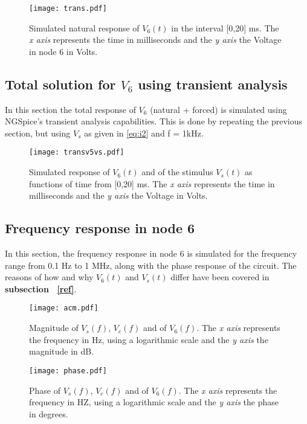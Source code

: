 \begin{figure}[H] \centering
\texttt{[image: trans.pdf]}
\caption{Simulated natural response of $V_6(t)$ in the interval [0,20] ms. The \textit{x axis} represents the time in milliseconds and the \textit{y axis} the Voltage in node 6  in Volts.  }
\label{fig:transient}
\end{figure}
\vspace{4cm}
\pagebreak
\subsection{ Total solution for $V_6$ using transient analysis}

In this section the total response of $V_6$ (natural + forced) is simulated using NGSpice's transient analysis capabilities. This is done by repeating the previous section, but using {\it $V_s$} as given in \ref{eq:i2} and f = 1kHz.\par
\begin{figure}[H] \centering
\texttt{[image: transv5vs.pdf]}
\caption{Simulated response of $V_{6}(t)$ and of the stimulus $V_{s}(t)$ as functions of time from [0,20] ms. The \textit{x axis} represents the time in milliseconds and the \textit{y axis} the Voltage in Volts.}
\label{fig:resp_total}
\end{figure}
\vspace{7cm}
\pagebreak


\subsection{ Frequency response in node 6}
In this section, the frequency response in node 6 is simulated for the frequency range from 0.1 Hz to 1 MHz, along with the phase response of the circuit.
The reasons of how and why $V_{6}(t)$ and $V_{s}(t)$ differ have been covered in \textbf{subsection ~\ref{ref}}.\par
\begin{figure}[H] \centering
\texttt{[image: acm.pdf]}
\caption{Magnitude of $V_s(f)$, $V_c(f)$  and of $V_6(f)$. The \textit{x axis} represents the frequency in Hz, using a logarithmic scale and the \textit{y axis} the magnitude in dB.}
\label{fig:Magnitude}
\end{figure}


\par
\begin{figure}[H] \centering
\texttt{[image: phase.pdf]}
\caption{Phase of $V_s(f)$, $V_c(f)$ and of $V_6(f)$. The \textit{x axis} represents the frequency in HZ, using a logarithmic scale and the \textit{y axis} the phase in degrees.}  
\label{fig:phase}
\end{figure}
